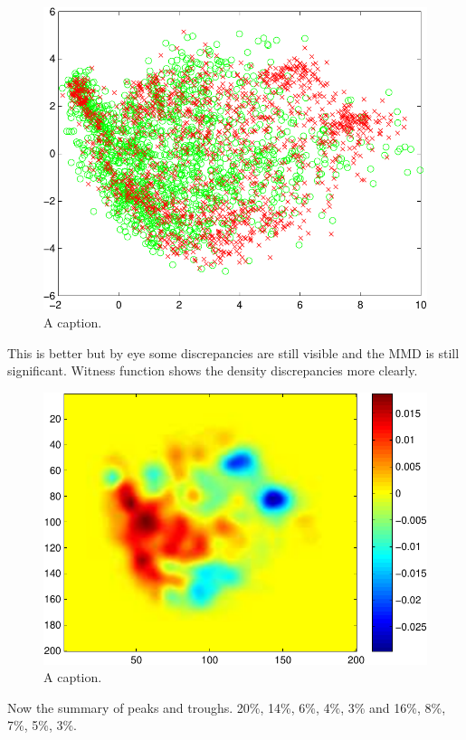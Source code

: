 \documentclass{article} %
\begin{document}
\begin{figure}[ht]
\centering
\includegraphics[width=0.98\columnwidth]{figures/many_rbm_pca}
\caption{
A caption.
}
\label{fig:many_rbm_pca}
\end{figure}

This is better but by eye some discrepancies are still visible and the MMD is still significant.
Witness function shows the density discrepancies more clearly.

\begin{figure}[ht]
\centering
\includegraphics[width=0.98\columnwidth]{figures/many_rbm_witness}
\caption{
A caption.
}
\label{fig:many_rbm_witness}
\end{figure}

Now the summary of peaks and troughs.
20\%, 14\%, 6\%, 4\%, 3\% and 16\%, 8\%, 7\%, 5\%, 3\%.
\end{document}

